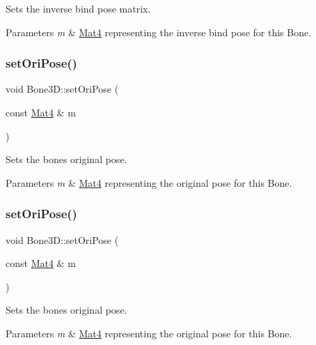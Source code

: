 Sets the inverse bind pose matrix.


\begin{DoxyParams}{Parameters}
{\em m} & \hyperlink{classMat4}{Mat4} representing the inverse bind pose for this Bone. \\
\hline
\end{DoxyParams}
\mbox{\label{classBone3D_abd2362340c7ad200d2e1e6974d27dfce}} 
\subsubsection{\texorpdfstring{set\+Ori\+Pose()}{setOriPose()}\hspace{0.1cm}{\footnotesize\ttfamily [1/2]}}
{\footnotesize\ttfamily void Bone3\+D\+::set\+Ori\+Pose (\begin{DoxyParamCaption}\item[{const \hyperlink{classMat4}{Mat4} \&}]{m }\end{DoxyParamCaption})}

Sets the bone\textquotesingle{}s original pose.


\begin{DoxyParams}{Parameters}
{\em m} & \hyperlink{classMat4}{Mat4} representing the original pose for this Bone. \\
\hline
\end{DoxyParams}
\mbox{\label{classBone3D_abd2362340c7ad200d2e1e6974d27dfce}} 
\subsubsection{\texorpdfstring{set\+Ori\+Pose()}{setOriPose()}\hspace{0.1cm}{\footnotesize\ttfamily [2/2]}}
{\footnotesize\ttfamily void Bone3\+D\+::set\+Ori\+Pose (\begin{DoxyParamCaption}\item[{const \hyperlink{classMat4}{Mat4} \&}]{m }\end{DoxyParamCaption})}

Sets the bone\textquotesingle{}s original pose.


\begin{DoxyParams}{Parameters}
{\em m} & \hyperlink{classMat4}{Mat4} representing the original pose for this Bone. \\
\hline
\end{DoxyParams}
\mbox{\label{classBone3D_a106b423193457bdc905e9a61d041d5d0}} 
